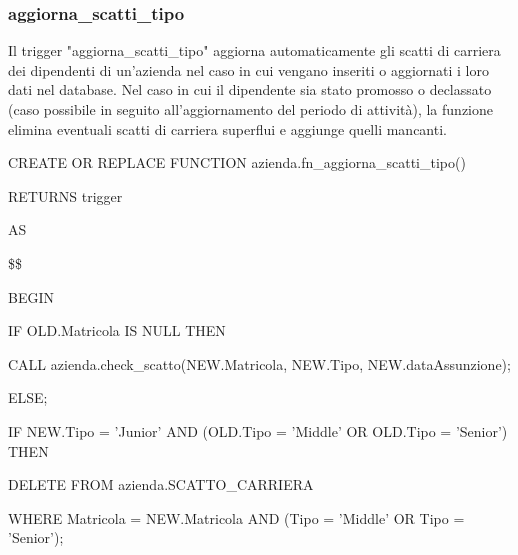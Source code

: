         \subsubsection{aggiorna\_scatti\_tipo}
        Il trigger "aggiorna\_scatti\_tipo" aggiorna automaticamente gli scatti di carriera dei dipendenti di un'azienda nel caso in cui vengano inseriti o aggiornati i loro dati nel database. Nel caso in cui il dipendente sia stato promosso o declassato (caso possibile in seguito all'aggiornamento del periodo di attività), la funzione elimina eventuali scatti di carriera superflui e aggiunge quelli mancanti.
        \ttfamily
            \begin{flushleft}
                \begin{description}
                    \item CREATE OR REPLACE FUNCTION azienda.fn\_aggiorna\_scatti\_tipo()  
                    \item RETURNS trigger
                    \item AS
                    \item \$\$
                    \item BEGIN 
                    \begin{description}
                            \item IF OLD.Matricola IS NULL THEN
                            \begin{description}
                                \item CALL azienda.check\_scatto(NEW.Matricola, NEW.Tipo, NEW.dataAssunzione);
                            \end{description}

                            \item ELSE;
                            \begin{description}
                                \item IF NEW.Tipo = 'Junior' AND (OLD.Tipo = 'Middle' OR OLD.Tipo = 'Senior') THEN
                                \begin{description}
                                    \item DELETE FROM azienda.SCATTO\_CARRIERA
                                    \item WHERE Matricola = NEW.Matricola AND (Tipo = 'Middle' OR Tipo = 'Senior');
                                \end{description}


\end{description}
\end{description}
\end{description}
\end{flushleft}
